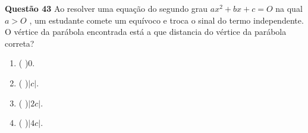 {\bf Questão 43} 
 Ao resolver uma equação do segundo grau $ax^2 + bx +c = O$ na qual $a > O$ , um estudante comete um
equívoco e troca o sinal do termo independente. O vértice da parábola encontrada está a que distancia do vértice
da parábola correta?

\begin{multicols}{2}
\begin{enumerate}
		\item ( )$0$.
		\item ( )$ |c|$.
		\item ( )$ |2c|$.
		\item ( )$ |4c|$.
		\end{enumerate}
\end{multicols}
